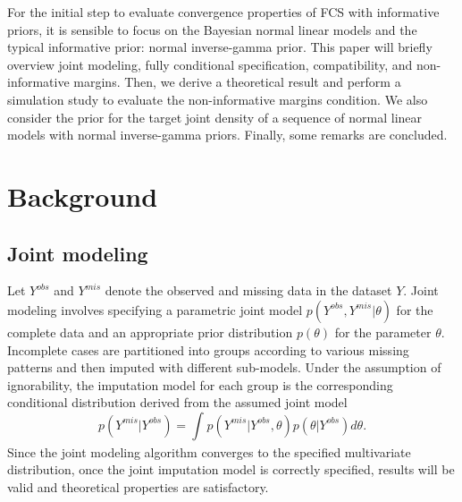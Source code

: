 	For the initial step to evaluate convergence properties of FCS with informative priors, it is sensible to focus on the Bayesian normal linear models and the typical informative prior: normal inverse-gamma prior. This paper will briefly overview joint modeling, fully conditional specification, compatibility, and non-informative margins. Then, we derive a theoretical result and perform a simulation study to evaluate the non-informative margins condition. We also consider the prior for the target joint density of a sequence of normal linear models with normal inverse-gamma priors. Finally, some remarks are concluded.
	
	\section{Background}
	\subsection{Joint modeling}
	Let $Y^{obs}$ and $Y^{mis}$ denote the observed and missing data in the dataset $Y$. Joint modeling involves specifying a parametric joint model $p(Y^{obs}, Y^{mis}|\theta)$ for the complete data and an appropriate prior distribution $p(\theta)$ for the parameter $\theta$. Incomplete cases are partitioned into groups according to various missing patterns and then imputed with different sub-models. Under the assumption of ignorability, the imputation model for each group is the corresponding conditional distribution derived from the assumed joint model 
	\begin{equation*}
		p(Y^{mis}|Y^{obs}) = \int_{}p(Y^{mis}| Y^{obs}, \theta)p(\theta|Y^{obs})d\theta.
	\end{equation*}
	Since the joint modeling algorithm converges to the specified multivariate distribution, once the joint imputation model is correctly specified, results will be valid and theoretical properties are satisfactory. 
	
